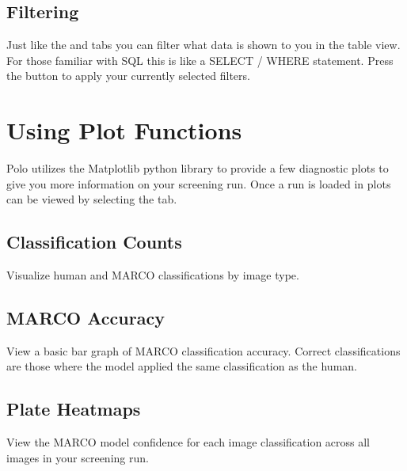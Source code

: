 \documentclass[letterpaper,10pt,english]{sphinxmanual}
\begin{document}
\subsection{Filtering}
\label{\detokenize{user_guide:id1}}
Just like the  and  tabs you can filter
what data is shown to you in the table view. For those familiar with SQL this
is like a SELECT / WHERE statement. Press the  button to
apply your currently selected filters.
\begin{quote}

\noindent{}
\end{quote}


\section{Using Plot Functions}
\label{\detokenize{user_guide:using-plot-functions}}
Polo utilizes the Matplotlib python library to provide a few diagnostic
plots to give you more information on your screening run. Once a run is loaded
in plots can be viewed by selecting the  tab.


\subsection{Classification Counts}
\label{\detokenize{user_guide:classification-counts}}
Visualize human and MARCO classifications by image type.
\begin{quote}

\noindent{}
\end{quote}


\subsection{MARCO Accuracy}
\label{\detokenize{user_guide:marco-accuracy}}
View a basic bar graph of MARCO classification accuracy. Correct classifications
are those where the model applied the same classification as the human.
\begin{quote}

\noindent{}
\end{quote}


\subsection{Plate Heatmaps}
\label{\detokenize{user_guide:plate-heatmaps}}
View the MARCO model confidence for each image classification across
all images in your screening run.
\begin{quote}

\noindent{}
\end{quote}
\end{document}
